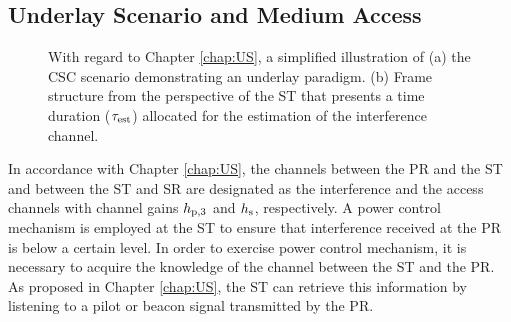 \subsection{Underlay Scenario and Medium Access}
\label{scenario}

\begin{figure}
	\centering
	\caption{ With regard to Chapter \ref{chap:US}, a simplified illustration of (a) the CSC scenario demonstrating an underlay paradigm. (b) Frame structure from the perspective of the ST that presents a time duration ($\tau_{\text{est}}$) allocated for the estimation of the interference channel.} 
	\label{fig_HVD:scenario}
\end{figure}




In accordance with Chapter \ref{chap:US}, the channels between the PR and the ST and between the ST and SR are designated as the interference and the access channels with channel gains $h_{\text{p,3}}$ and $h_{\text{s}}$, respectively. A power control mechanism is employed at the ST to ensure that interference received at the PR is below a certain level. In order to exercise power control mechanism, it is necessary to acquire the knowledge of the channel between the ST and the PR. As proposed in Chapter \ref{chap:US}, the ST can retrieve this information by listening to a pilot or beacon signal transmitted by the PR. %


